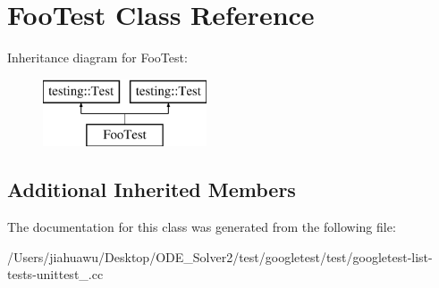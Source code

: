 \hypertarget{class_foo_test}{}\section{Foo\+Test Class Reference}
\label{class_foo_test}
Inheritance diagram for Foo\+Test\+:\begin{figure}[H]
\begin{center}
\leavevmode
\includegraphics[height=2.000000cm]{class_foo_test}
\end{center}
\end{figure}
\subsection*{Additional Inherited Members}


The documentation for this class was generated from the following file\+:\begin{DoxyCompactItemize}
\item 
/\+Users/jiahuawu/\+Desktop/\+O\+D\+E\+\_\+\+Solver2/test/googletest/test/googletest-\/list-\/tests-\/unittest\+\_\+.\+cc\end{DoxyCompactItemize}
